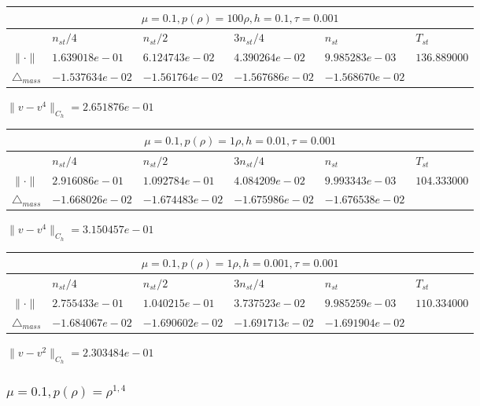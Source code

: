\documentclass[12pt,a4paper]{article}
\begin{document}
\begin{tabular}{*{6}{|l}|}
    \hline
     \\
    \hline
    &$n_{st}/4 $&$ n_{st}/2$&$3n_{st}/4$&$n_{st}$&$T_{st}$ \\
    \hline
$\|\cdot \|$& $1.639018e-01$ & $6.124743e-02$ & $4.390264e-02$ & $9.985283e-03$ &$136.889000$\\
\hline
$\triangle_{mass}$& $-1.537634e-02$ & $-1.561764e-02$ & $-1.567686e-02$ & $-1.568670e-02$ &\\
\hline    
\end{tabular}

$\|v-v^{4}\|_{C_h} = 2.651876e-01$

\begin{tabular}{*{6}{|l}|}
    \hline
     \\
    \hline
    &$n_{st}/4 $&$ n_{st}/2$&$3n_{st}/4$&$n_{st}$&$T_{st}$ \\
    \hline
    $\|\cdot \|$& $2.916086e-01$ & $1.092784e-01$ & $4.084209e-02$ & $9.993343e-03$ &$104.333000$\\
\hline
$\triangle_{mass}$& $-1.668026e-02$ & $-1.674483e-02$ & $-1.675986e-02$ & $-1.676538e-02$ &\\
\hline
\end{tabular}

$\|v-v^{4}\|_{C_h} = 3.150457e-01$


\begin{tabular}{*{6}{|l}|}
    \hline
     \\
    \hline
    &$n_{st}/4 $&$ n_{st}/2$&$3n_{st}/4$&$n_{st}$&$T_{st}$ \\
    \hline
$\|\cdot \|$& $2.755433e-01$ & $1.040215e-01$ & $3.737523e-02$ & $9.985259e-03$ &$110.334000$\\
\hline
$\triangle_{mass}$& $-1.684067e-02$ & $-1.690602e-02$ & $-1.691713e-02$ & $-1.691904e-02$ &\\
\hline

\end{tabular}

$\|v-v^{2}\|_{C_h} = 2.303484e-01$

\subsubsection{$\mu = 0.1, p(\rho) = \rho^{1,4} $}
\end{document}
